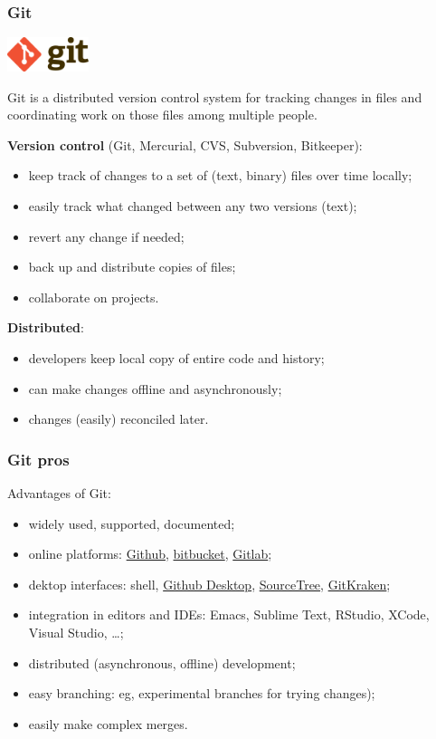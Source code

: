 \documentclass[10pt,svgnames,handout]{beamer}
\begin{document}
\begin{frame}
\frametitle{Git}
\includegraphics[height=1cm]{Git-logo}

Git is a distributed version control system for tracking changes in files and coordinating work on those files among multiple people.

\textbf{Version control} (Git, Mercurial, CVS, Subversion, Bitkeeper):
\begin{itemize}
   \item keep track of changes to a set of (text, binary) files over time locally;
   \item easily track what changed between any two versions (text);
   \item revert any change if needed;
   \item back up and distribute copies of files;
   \item collaborate on projects.
 \end{itemize} 

\textbf{Distributed}:
\begin{itemize}
  \item developers keep local copy of entire code and history;
  \item can make changes offline and asynchronously;
  \item changes (easily) reconciled later.
\end{itemize}
\end{frame}


\begin{frame}
\frametitle{Git pros}

Advantages of Git:
\begin{itemize}
  \item widely used, supported, documented;
  \item online platforms: \href{https://github.com/}{Github}, \href{https://bitbucket.org/}{bitbucket}, \href{https://about.gitlab.com/}{Gitlab};
  \item dektop interfaces: shell, \href{https://desktop.github.com/}{Github Desktop}, \href{https://www.sourcetreeapp.com/}{SourceTree}, \href{https://www.gitkraken.com/}{GitKraken};
  \item integration in editors and IDEs: Emacs, Sublime Text, RStudio, XCode, Visual Studio, \ldots;
  \item distributed (asynchronous, offline) development;
  \item easy branching: eg, experimental branches for trying changes);
  \item easily make complex merges.
\end{itemize}
\end{frame}
\end{document}
